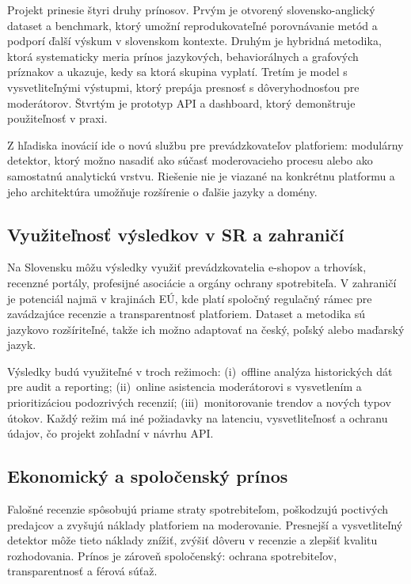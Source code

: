 \documentclass[11pt,a4paper]{article}
\begin{document}
Projekt prinesie štyri druhy prínosov. Prvým je otvorený slovensko-anglický dataset a benchmark, ktorý umožní reprodukovateľné porovnávanie metód a podporí ďalší výskum v slovenskom kontexte. Druhým je hybridná metodika, ktorá systematicky meria prínos jazykových, behaviorálnych a grafových príznakov a ukazuje, kedy sa ktorá skupina vyplatí. Tretím je model s vysvetliteľnými výstupmi, ktorý prepája presnosť s dôveryhodnosťou pre moderátorov. Štvrtým je prototyp API a dashboard, ktorý demonštruje použiteľnosť v praxi.

Z hľadiska inovácií ide o novú službu pre prevádzkovateľov platforiem: modulárny detektor, ktorý možno nasadiť ako súčasť moderovacieho procesu alebo ako samostatnú analytickú vrstvu. Riešenie nie je viazané na konkrétnu platformu a jeho architektúra umožňuje rozšírenie o ďalšie jazyky a domény.

\subsection{Využiteľnosť výsledkov v SR a zahraničí}

Na Slovensku môžu výsledky využiť prevádzkovatelia e-shopov a trhovísk, recenzné portály, profesijné asociácie a orgány ochrany spotrebiteľa. V zahraničí je potenciál najmä v krajinách EÚ, kde platí spoločný regulačný rámec pre zavádzajúce recenzie a transparentnosť platforiem. Dataset a metodika sú jazykovo rozšíriteľné, takže ich možno adaptovať na český, poľský alebo maďarský jazyk.

Výsledky budú využiteľné v troch režimoch: (i)~offline analýza historických dát pre audit a reporting; (ii)~online asistencia moderátorovi s vysvetlením a prioritizáciou podozrivých recenzií; (iii)~monitorovanie trendov a nových typov útokov. Každý režim má iné požiadavky na latenciu, vysvetliteľnosť a ochranu údajov, čo projekt zohľadní v návrhu API.

\subsection{Ekonomický a spoločenský prínos}

Falošné recenzie spôsobujú priame straty spotrebiteľom, poškodzujú poctivých predajcov a zvyšujú náklady platforiem na moderovanie. Presnejší a vysvetliteľný detektor môže tieto náklady znížiť, zvýšiť dôveru v recenzie a zlepšiť kvalitu rozhodovania. Prínos je zároveň spoločenský: ochrana spotrebiteľov, transparentnosť a férová súťaž.
\end{document}
